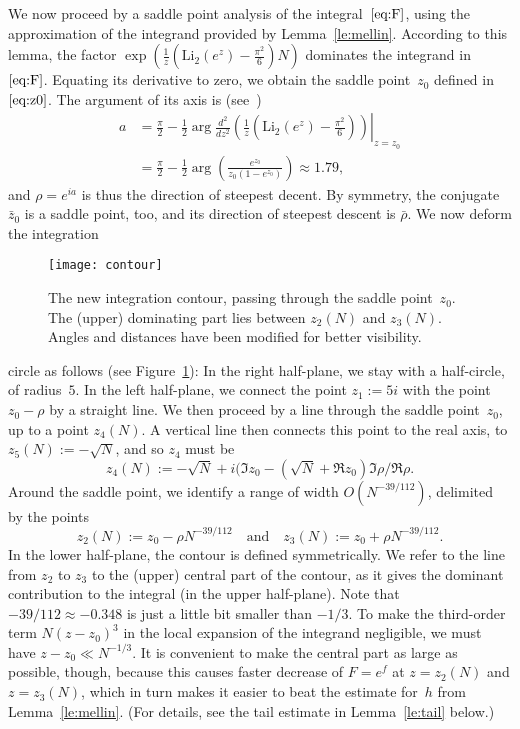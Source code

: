 \documentclass[a4paper]{amsart}
\begin{document}
We now proceed by a saddle point analysis of the integral~$\eqref{eq:F}$,
using the approximation of the integrand provided by Lemma~\ref{le:mellin}.
According to this lemma, the factor
$ \exp\left(  \frac1z
  \left( \mathrm{Li}_2(e^z) - \frac{\pi^2}{6}\right) N \right)$
dominates the integrand in~$\eqref{eq:F}$. Equating its derivative to zero,
we obtain the saddle point~$z_0$ defined in~$\eqref{eq:z0}$. The argument
of its axis is (see~\cite{deBr58})
\begin{align*}
   a &= \frac{ \pi}{2} - \frac12 \arg \frac{d^2}{dz^2} \left.\left(
    \frac1z  \left( \mathrm{Li}_2(e^z) - \frac{\pi^2}{6}\right)\right)
    \right|_{z=z_0} \\
   &=  \frac{ \pi}{2} - \frac12 \arg\left( \frac{e^{z_0}}{z_0(1-e^{z_0})} \right) \approx 1.79,
\end{align*}
and $\rho=e^{ia}$ is thus the direction of steepest decent. By symmetry, the conjugate
$\bar{z}_0$ is a saddle point, too, and its direction of steepest descent is $\bar{\rho}$.
We now deform the integration
%
\begin{figure}
\begin{center}
\texttt{[image: contour]}
\end{center}
\caption{\label{fig:path} The new integration contour, passing through
the saddle point~$z_0$. The (upper) dominating part lies between
$z_2(N)$ and $z_3(N)$. Angles and distances have been modified
for better visibility.}
\end{figure}
%
circle as follows (see Figure~\ref{fig:path}):
In the right half-plane, we stay with a half-circle, of radius~$5$. In the left half-plane,
we connect the point $z_1:=5i$ with the point $ z_0-\rho$ by a straight line. We then proceed by a
line through the saddle point~$z_0$,
up to a point $z_4(N)$. A vertical line then connects this point to the real
axis, to $z_5(N):=-\sqrt{N}$, and so $z_4$ must be
\[
  z_4(N) := -\sqrt{N} + i (\Im z_0-(\sqrt{N}+\Re z_0) \Im \rho / \Re \rho.
\]
Around the saddle point, we identify a range of width $O(N^{-39/112})$,
delimited by the points
\[
  z_2(N):=z_0-\rho N^{-39/112} \quad \text{and} \quad
  z_3(N):=z_0+\rho N^{-39/112}.
\]
In the lower half-plane, the contour is defined symmetrically.
We refer to the line from $z_2$ to $z_3$ to the (upper) central part
of the contour, as it gives the dominant contribution to the
integral (in the upper half-plane).
Note that $-39/112\approx -0.348$ is just a little bit smaller than $-1/3$.
To make the third-order term $N(z-z_0)^3$ in the local expansion of the integrand
negligible, we must have $z-z_0 \ll N^{-1/3}$. It is convenient
to make the central part as large as possible, though, because
this causes faster decrease of $F=e^f$ at $z=z_2(N)$
and $z=z_3(N)$, which
in turn makes it easier to beat the estimate for~$h$ from Lemma~\ref{le:mellin}.
(For details, see the tail estimate in Lemma~\ref{le:tail} below.)
\end{document}
